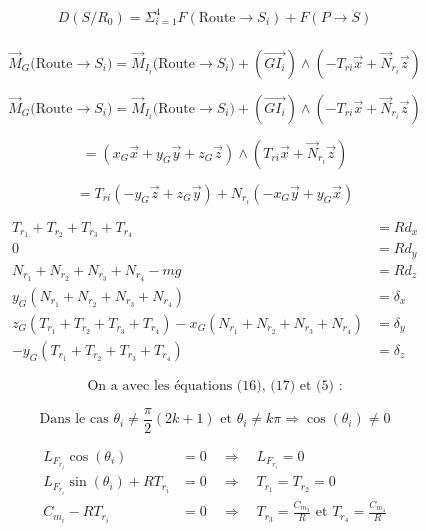 \documentclass[a4paper,12pt]{report}  %
\begin{document}
\begin{align*}
	D(S/R_0) = \Sigma_{i=1}^{4}{F}(\text{Route} \rightarrow S_i) + {F}(P \rightarrow S) \\
\end{align*}




$$
\vec{M}_{G}({\text{Route} \rightarrow S_i)} = \vec{M}_{I_i}({\text{Route}\rightarrow S_i)} + \left( \overrightarrow{GI_i} \right) \wedge (-{T}_{ri}\vec{x} + \vec{N}_{r_i} \vec{z})
$$

$$
\vec{M}_{G}({\text{Route} \rightarrow S_i)} = \vec{M}_{I_i}({\text{Route}\rightarrow S_i)} + \left( \overrightarrow{GI_i} \right) \wedge (-{T}_{ri}\vec{x} + \vec{N}_{r_i} \vec{z})
$$

$$
=(x_G \vec{x} + y_G \vec{y} + z_G \vec{z}) \wedge ({T}_{ri}\vec{x} + \vec{N}_{r_i} \vec{z}) 
$$



$$
={T}_{ri}(-y_G \vec{z} + z_G \vec{y}) + N_{r_i}(-x_G\vec{y} +  y_G\vec{x}) 
$$


\begin{align*}
	T_{r_1}+T_{r_2}+T_{r_3}+T_{r_4} &= Rd_x \tag{19}\\
	0 &= Rd_y \tag{20} \\
	N_{r_1}+N_{r_2}+N_{r_3}+N_{r_4}-mg &= Rd_z \tag{21} \\
	y_G(N_{r_1}+N_{r_2}+N_{r_3}+N_{r_4}) &= \delta_x \tag{22} \\
	z_G(T_{r_1}+T_{r_2}+T_{r_3}+T_{r_4}) - x_G(N_{r_1}+N_{r_2}+N_{r_3}+N_{r_4}) &= \delta_y \tag{23} \\
	-y_G(T_{r_1}+T_{r_2}+T_{r_3}+T_{r_4}) &= \delta_z \tag{24}
\end{align*}





$$
\text{On a avec les équations (16), (17) et (5) :}
$$

$$
\text{Dans le cas } \theta_i \neq \frac{\pi}{2}(2k+1)\text{ et } \theta_i \neq k\pi 
\Rightarrow \cos(\theta_i) \neq 0
$$



\begin{align*}
	L_{F_{r_i}} \cos(\theta_i) &= 0 \quad \Rightarrow \quad L_{F_{r_i}} = 0 \\
	L_{F_{r_i}} \sin(\theta_i) + R T_{r_i} &= 0 \quad \Rightarrow \quad T_{r_1} = T_{r_2} = 0 \\
	C_{m_i} - R T_{r_i} &= 0 \quad \Rightarrow \quad T_{r_3} = \frac{C_{m_3}}{R} \text{ et } T_{r_4} = \frac{C_{m_4}}{R}
\end{align*}
\end{document}
